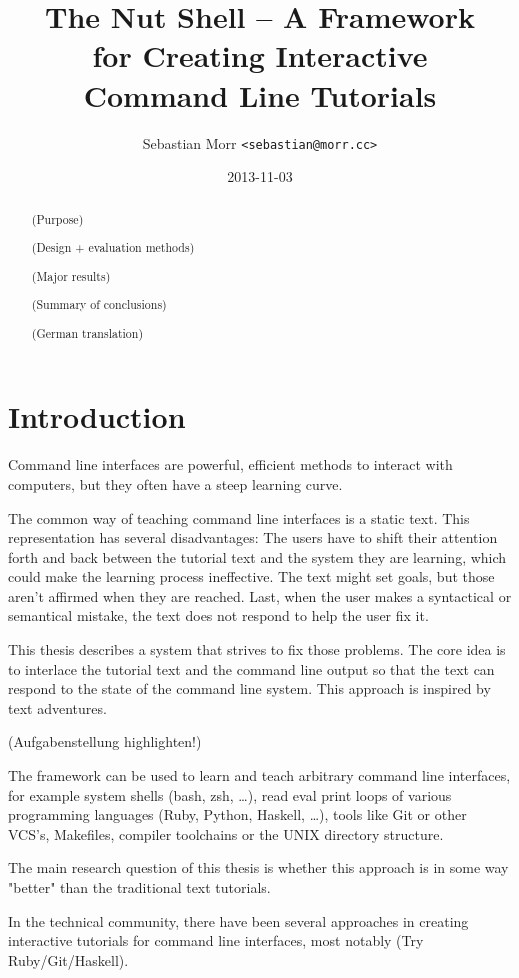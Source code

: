 \documentclass[twoside]{scrreprt}
\title{The Nut Shell -- A Framework \\ for Creating Interactive \\ Command Line Tutorials}
\author{Sebastian Morr \texttt{<sebastian@morr.cc>}}
\date{2013-11-03}
\begin{document}
\maketitle

\begin{abstract}
(Purpose)

(Design + evaluation methods)

(Major results)

(Summary of conclusions)

\vspace{8em}

(German translation)
\end{abstract}

\setcounter{tocdepth}{0}
\tableofcontents

\chapter{Introduction}

Command line interfaces are powerful, efficient methods to interact with computers, but they often have a steep learning curve.

The common way of teaching command line interfaces is a static text. This representation has several disadvantages: The users have to shift their attention forth and back between the tutorial text and the system they are learning, which could make the learning process ineffective. The text might set goals, but those aren't affirmed when they are reached. Last, when the user makes a syntactical or semantical mistake, the text does not respond to help the user fix it.

This thesis describes a system that strives to fix those problems. The core idea is to interlace the tutorial text and the command line output so that the text can respond to the state of the command line system. This approach is inspired by text adventures.

(Aufgabenstellung highlighten!)

The framework can be used to learn and teach arbitrary command line interfaces, for example system shells (bash, zsh, …), read eval print loops of various programming languages (Ruby, Python, Haskell, …), tools like Git or other VCS's, Makefiles, compiler toolchains or the UNIX directory structure.

The main research question of this thesis is whether this approach is in some way "better" than the traditional text tutorials.

In the technical community, there have been several approaches in creating interactive tutorials for command line interfaces, most notably (Try Ruby/Git/Haskell).
\end{document}
